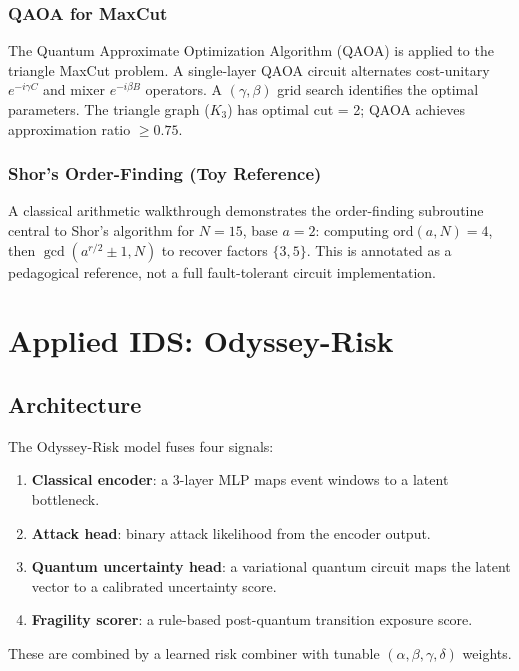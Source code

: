 \documentclass[conference]{IEEEtran}
\begin{document}
\subsubsection{QAOA for MaxCut}

The Quantum Approximate Optimization Algorithm (QAOA) is applied to the triangle MaxCut problem. A single-layer QAOA circuit alternates cost-unitary $e^{-i\gamma C}$ and mixer $e^{-i\beta B}$ operators. A $(\gamma, \beta)$ grid search identifies the optimal parameters. The triangle graph ($K_3$) has optimal cut = 2; QAOA achieves approximation ratio $\geq 0.75$.

\subsubsection{Shor's Order-Finding (Toy Reference)}

A classical arithmetic walkthrough demonstrates the order-finding subroutine central to Shor's algorithm for $N=15$, base $a=2$: computing $\text{ord}(a, N) = 4$, then $\gcd(a^{r/2} \pm 1, N)$ to recover factors $\{3, 5\}$. This is annotated as a pedagogical reference, not a full fault-tolerant circuit implementation.

\section{Applied IDS: Odyssey-Risk}

\subsection{Architecture}

The Odyssey-Risk model fuses four signals:

\begin{enumerate}
  \item \textbf{Classical encoder}: a 3-layer MLP maps event windows to a latent bottleneck.
  \item \textbf{Attack head}: binary attack likelihood from the encoder output.
  \item \textbf{Quantum uncertainty head}: a variational quantum circuit maps the latent vector to a calibrated uncertainty score.
  \item \textbf{Fragility scorer}: a rule-based post-quantum transition exposure score.
\end{enumerate}

These are combined by a learned risk combiner with tunable $(\alpha, \beta, \gamma, \delta)$ weights.
\end{document}

